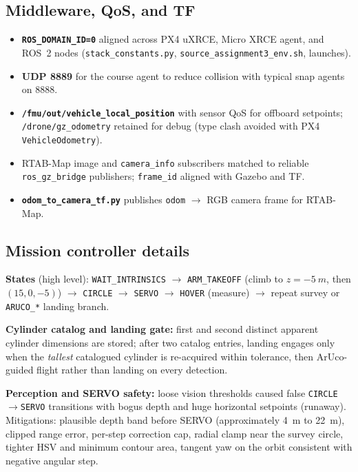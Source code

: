 \documentclass[11pt]{article}
\begin{document}
\subsection{Middleware, QoS, and TF}
\begin{itemize}[itemsep=2pt]
    \item \textbf{\texttt{ROS\_DOMAIN\_ID=0}} aligned across PX4 uXRCE, Micro XRCE agent, and ROS~2 nodes (\texttt{stack\_constants.py}, \texttt{source\_assignment3\_env.sh}, launches).
    \item \textbf{UDP 8889} for the course agent to reduce collision with typical snap agents on 8888.
    \item \textbf{\texttt{/fmu/out/vehicle\_local\_position}} with sensor QoS for offboard setpoints; \texttt{/drone/gz\_odometry} retained for debug (type clash avoided with PX4 \texttt{VehicleOdometry}).
    \item RTAB-Map image and \texttt{camera\_info} subscribers matched to reliable \texttt{ros\_gz\_bridge} publishers; \texttt{frame\_id} aligned with Gazebo and TF.
    \item \textbf{\texttt{odom\_to\_camera\_tf.py}} publishes \texttt{odom} $\rightarrow$ RGB camera frame for RTAB-Map.
\end{itemize}

\subsection{Mission controller details}
\label{sec:mission}
\textbf{States} (high level): \texttt{WAIT\_INTRINSICS} $\rightarrow$ \texttt{ARM\_TAKEOFF} (climb to $z=\SI{-5}{m}$, then $(15,0,-5)$) $\rightarrow$ \texttt{CIRCLE} $\rightarrow$ \texttt{SERVO} $\rightarrow$ \texttt{HOVER} (measure) $\rightarrow$ repeat survey or \texttt{ARUCO\_*} landing branch.

\textbf{Cylinder catalog and landing gate:} first and second distinct apparent cylinder dimensions are stored; after two catalog entries, landing engages only when the \emph{tallest} catalogued cylinder is re-acquired within tolerance, then ArUco-guided flight rather than landing on every detection.

\textbf{Perception and SERVO safety:} loose vision thresholds caused false \texttt{CIRCLE}$\rightarrow$\texttt{SERVO} transitions with bogus depth and huge horizontal setpoints (runaway). Mitigations: plausible depth band before SERVO (approximately \SI{4}{m} to \SI{22}{m}), clipped range error, per-step correction cap, radial clamp near the survey circle, tighter HSV and minimum contour area, tangent yaw on the orbit consistent with negative angular step.
\end{document}
